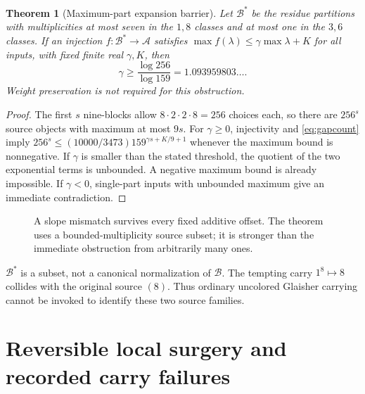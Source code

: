 \documentclass[11pt,a4paper]{article}
\newtheorem{theorem}{Theorem}[section]
\theoremstyle{definition}
\renewcommand{\AA}{\mathcal A}
\newcommand{\BB}{\mathcal B}
\begin{document}
\begin{theorem}[Maximum-part expansion barrier]\label{thm:entropy}
Let $\BB^*$ be the residue partitions with multiplicities at most seven in
the $1,8$ classes and at most one in the $3,6$ classes. If an injection
$f:\BB^*\to\AA$ satisfies
$\max f(\lambda)\le\gamma\max\lambda+K$ for all inputs, with fixed finite
real $\gamma,K$, then
\[
\gamma\ge\frac{\log256}{\log159}=1.093959803\ldots.
\]
Weight preservation is not required for this obstruction.
\end{theorem}
\begin{proof}
The first $s$ nine-blocks allow $8\cdot2\cdot2\cdot8=256$ choices each,
so there are $256^s$ source objects with maximum at most $9s$.
For $\gamma\ge0$, injectivity and \eqref{eq:gapcount} imply
$256^s\le(10000/3473)159^{\gamma s+K/9+1}$ whenever the maximum bound is
nonnegative. If $\gamma$ is smaller than the stated threshold, the quotient
of the two exponential terms is unbounded. A negative maximum bound is already
impossible. If $\gamma<0$, single-part inputs with unbounded maximum give an
immediate contradiction.
\end{proof}

\begin{figure}[ht]
\centering
{}
\caption{A slope mismatch survives every fixed additive offset. The theorem
uses a bounded-multiplicity source subset; it is stronger than the immediate
obstruction from arbitrarily many ones.}
\end{figure}

$\BB^*$ is a subset, not a canonical normalization of $\BB$.
The tempting carry $1^8\mapsto8$ collides with the original source $(8)$.
Thus ordinary uncolored Glaisher carrying cannot be invoked to identify
these two source families.

\section{Reversible local surgery and recorded carry failures}
\end{document}
